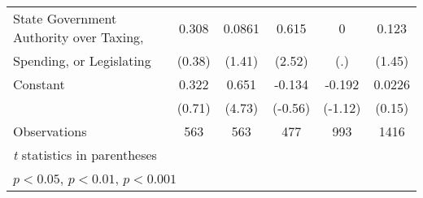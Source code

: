 {\begin{tabular}{l*{5}{c}}
\addlinespace
State Government Authority over Taxing, &0.308         &0.0861         &0.615\sym{*}  &    0         &0.123         \\
Spending, or Legislating                &(0.38)         &(1.41)         &(2.52)         &  (.)         &(1.45)         \\
\addlinespace
Constant                                &0.322         &0.651\sym{***}&-0.134         &-0.192         &0.0226         \\
                                        &(0.71)         &(4.73)         &(-0.56)         &(-1.12)         &(0.15)         \\
\midrule
Observations                            &  563         &  563         &  477         &  993         & 1416         \\
\bottomrule
\multicolumn{6}{l}{\footnotesize \textit{t} statistics in parentheses}\\
\multicolumn{6}{l}{\footnotesize \sym{*} \(p<0.05\), \sym{**} \(p<0.01\), \sym{***} \(p<0.001\)}\\
\end{tabular}
}
